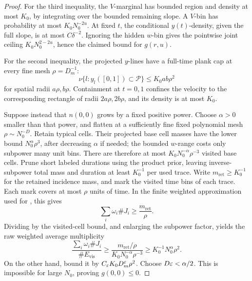 \begin{proof}
For the third inequality, the \(V\)-marginal has bounded
region and density at most \(K_0\), by integrating
 over the bounded remaining
slope.  A \(V\)-bin has probability at most
\(K_0N_0^{-2u}\).
At fixed \(t\), the conditional \(y(t)\)-density,
given the full slope, is at most \(C\delta^{-2}\).
Ignoring the hidden \(w\)-bin gives the pointwise
joint ceiling \(K_0N_0^{2-2u}\), hence the claimed
bound for \(g(r,u)\).

For the second inequality, the projected \(y\)-lines
have a full-time plank cap at every fine mesh
\(\rho=D_m^{-1}\):
\begin{equation}
 \nu\{l:y_l([0,1])\subset\mathcal P\}
 \le K_0ab\rho^2
 \label{a01:projected-full-plank-cap}
\end{equation}
for spatial radii \(a\rho,b\rho\).
Containment at \(t=0,1\) confines the velocity to the
corresponding rectangle of radii \(2a\rho,2b\rho\),
and its density is at most \(K_0\).

Suppose instead that \(n(0,0)\) grows by a fixed
positive power.  Choose \(\alpha>0\) smaller than that
power, and flatten at a sufficiently fine fixed
polynomial mesh \(\rho\sim N_0^{-D}\).
Retain typical cells.  Their projected base cell
masses have the lower bound
\(N_0^\alpha\rho^3\), after decreasing \(\alpha\)
if needed; the bounded \(w\)-range costs only
subpower many unit bins.
There are therefore at most
\(K_0N_0^{-\alpha}\rho^{-3}\) visited base cells.
Prune short labeled durations using the product
prior, leaving inverse-subpower total mass and
duration at least \(K_0^{-1}\) per used trace.
Write \(m_{\mathrm{ret}}\ge K_0^{-1}\) for the retained
incidence mass, and mark the visited time bins of each trace.
Each mark covers at most \(\rho\) units of time. In the finite
weighted approximation used for , this gives
\[
 \sum_i\omega_i\#J_i\ge\frac{m_{\mathrm{ret}}}{\rho}.
\]
Dividing by the visited-cell bound, and enlarging the subpower
factor, yields the raw weighted average multiplicity
\[
 \frac{\sum_i\omega_i\#J_i}{\#E_{\mathrm{vis}}}
 \ge\frac{m_{\mathrm{ret}}/\rho}
              {K_0N_0^{-\alpha}\rho^{-3}}
 \ge K_0^{-1}N_0^\alpha\rho^2.
\]
On the other hand,
bound it by \(C_\varepsilon K_0D_m^\varepsilon\rho^2\).
Choose \(D\varepsilon<\alpha/2\).
This is impossible for large \(N_0\), proving
\(g(0,0)\le0\).


\end{proof}
